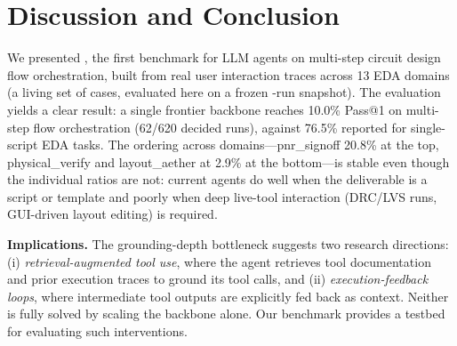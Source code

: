 \section{Discussion and Conclusion}
\label{sec:conclusion}


We presented \bench, the first benchmark for LLM agents on multi-step circuit design flow orchestration, built from real user interaction traces across 13 EDA domains (a living set of \Ntasks{} cases, evaluated here on a frozen \Neval{}-run snapshot). The evaluation yields a clear result: a single frontier backbone reaches 10.0\% Pass@1 on multi-step flow orchestration (62/620 decided runs), against 76.5\% reported for single-script EDA tasks. The ordering across domains---pnr\_signoff 20.8\% at the top, physical\_verify and layout\_aether at 2.9\% at the bottom---is stable even though the individual ratios are not: current agents do well when the deliverable is a script or template and poorly when deep live-tool interaction (DRC/LVS runs, GUI-driven layout editing) is required.

\textbf{Implications.} The grounding-depth bottleneck suggests two research directions: (i) \emph{retrieval-augmented tool use}, where the agent retrieves tool documentation and prior execution traces to ground its tool calls, and (ii) \emph{execution-feedback loops}, where intermediate tool outputs are explicitly fed back as context. Neither is fully solved by scaling the backbone alone. Our benchmark provides a testbed for evaluating such interventions.

